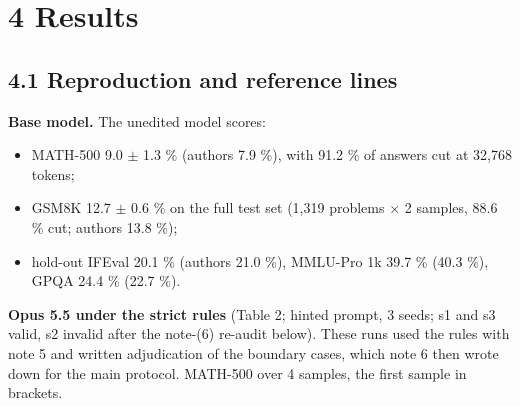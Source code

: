 \documentclass[
  10pt,
]{article}
\providecommand{\tightlist}{%
  \setlength{\itemsep}{0pt}\setlength{\parskip}{0pt}}
\begin{document}
\section{4 Results}\label{results}

\subsection{4.1 Reproduction and reference
lines}\label{reproduction-and-reference-lines}

\textbf{Base model.} The unedited model scores:

\begin{itemize}
\tightlist
\item
  MATH-500 9.0 \ensuremath{\pm} 1.3 \% (authors 7.9 \%), with 91.2 \% of answers cut at
  32,768 tokens;
\item
  GSM8K 12.7 \ensuremath{\pm} 0.6 \% on the full test set (1,319 problems \ensuremath{\times} 2 samples,
  88.6 \% cut; authors 13.8 \%);
\item
  hold-out IFEval 20.1 \% (authors 21.0 \%), MMLU-Pro 1k 39.7 \% (40.3
  \%), GPQA 24.4 \% (22.7 \%).
\end{itemize}

\textbf{Opus 5.5 under the strict rules} (Table 2; hinted prompt, 3
seeds; s1 and s3 valid, s2 invalid after the note-(6) re-audit below).
These runs used the rules with note 5 and written adjudication of the
boundary cases, which note 6 then wrote down for the main protocol.
MATH-500 over 4 samples, the first sample in brackets.
\end{document}
